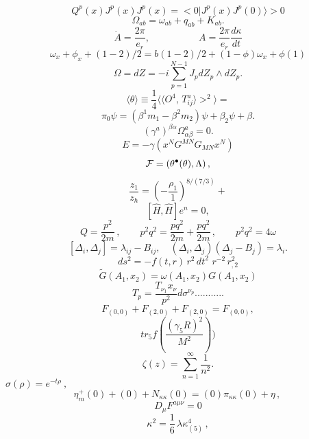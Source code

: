 \documentclass{article}
\begin{document}
$$Q ^ { p } ( x ) J ^ { p } ( x ) J ^ { p } ( x ) = < 0 | J ^ { p } ( x ) J ^ { p } ( 0 ) \rangle > 0$$
$$\Omega _ { a b } = \omega _ { a b } + q _ { a b } + K _ { a b } .$$
$$\dot { A } = \frac { 2 \pi } { e _ { r } } , ~ ~ ~ ~ ~ ~ ~ ~ ~ ~ ~ ~ ~ ~ ~ ~ ~ ~ ~ ~ ~ ~ ~ A = \frac { 2 \pi } { e _ { r } } \frac { d \kappa } { d t }$$
$$\omega _ { x } + \phi _ { x } + ( 1 - 2 ) / 2 = b ( 1 - 2 ) / 2 + ( 1 - \phi ) \omega _ { x } + \phi ( 1 )$$
$$\Omega = d Z = - i \sum _ { p = 1 } ^ { N - 1 } J _ { p } d Z _ { p } \wedge d Z _ { p } .$$
$$\langle \theta \rangle \equiv \frac { 1 } { 4 } \langle \langle O ^ { 4 } , \, T _ { i j } ^ { a } \rangle > ^ { 2 } \rangle =$$
$$\pi _ { 0 } \psi = ( \beta ^ { 1 } m _ { 1 } - \beta ^ { 2 } m _ { 2 } ) \psi + \beta _ { 2 } \psi + \beta .$$
$$( \gamma ^ { a } ) ^ { \beta \alpha } \Omega _ { \alpha \beta } ^ { a } = 0 .$$
$$E = - \gamma ( x ^ { N } G ^ { M N } G _ { M N } x ^ { N } )$$
$${ \cal F } = ( \theta ^ { \bullet } ( \theta ) , \Lambda ) \, ,$$
$$\frac { z _ { 1 } } { z _ { h } } = \left ( - \frac { \rho _ { 1 } } { 1 } \right ) ^ { 8 / ( 7 / 3 ) } +$$
$$[ \hat { H } , \hat { H } ] e ^ { { \hat { n } } } { } = 0 ,$$
$$Q = \frac { p ^ { 2 } } { 2 m } \, , \qquad p ^ { 2 } q ^ { 2 } = \frac { p q ^ { 2 } } { 2 m } + \frac { p q ^ { 2 } } { 2 m } \, , \qquad p ^ { 2 } q ^ { 2 } = 4 \omega$$
$$[ \Delta _ { i } , \Delta _ { j } ] = \lambda _ { i j } - B _ { i j } , \quad ( \Delta _ { i } , \Delta _ { j } ) ( \Delta _ { j } - B _ { j } ) = \lambda _ { i } .$$
$$d s ^ { 2 } = - f ( t , r ) \, r ^ { 2 } \, d t ^ { 2 } \, \, r ^ { - 2 } \, r _ { , 2 } ^ { 2 }$$
$$\tilde { G } ( A _ { 1 } , x _ { 2 } ) = \omega ( A _ { 1 } , x _ { 2 } ) G ( A _ { 1 } , x _ { 2 } )$$
$$T _ { p } = \frac { T _ { \nu _ { 1 } } x _ { \nu } } { p ^ { 2 } } d \sigma ^ { \nu _ { p } } . . . . . . . . . . .$$
$$F _ { ( 0 , 0 ) } + F _ { ( 2 , 0 ) } + F _ { ( 2 , 0 ) } = F _ { ( 0 , 0 ) } ,$$
$$t r _ { 5 } f ( \frac { ( \gamma _ { 5 } R ) ^ { 2 } } { M ^ { 2 } } ) )$$
$$\zeta ( z ) = \sum _ { n = 1 } ^ { \infty } \frac { 1 } { n ^ { 2 } } .$$
$$\sigma ( \rho ) = e ^ { - t \rho } \ , \ \ \ \ \ \ \ \ \ \ \ \ \ \ \ \ \ \ \ \ \ \ \ \ \ \ \ \ \ \ \ \ \ \ \ \ \ \ \ \ \ \ \ \ \ \ \ \ \ \ \ \ \ \ \ \ \ \ \ \ \ \ \ \ \ \ \ \ \ \ \ \ \ \ \ \ \ \ \ \ \ \ \ \ \ \ \ \ \ \ \ \ \ \ \ \ \ \ \ \ \ \ \ \ \ \ \ \ \ \ \ \ \ \ \ \ \ \ \ \ \ \ \ \ \ \ \ \ \ \ \ \ \ \ \ \ $$
$$\eta _ { m } ^ { + } ( 0 ) + ( 0 ) + N _ { \kappa \kappa } \left ( 0 \right ) = \left ( 0 \right ) \pi _ { \kappa \kappa } \left ( 0 \right ) + \eta \, , \,$$
$$D _ { \mu } F ^ { a \mu \nu } = 0$$
$$\kappa ^ { 2 } = \frac { 1 } { 6 } \, \lambda \kappa _ { ( 5 ) } ^ { 4 } \, ,$$
\end{document}
